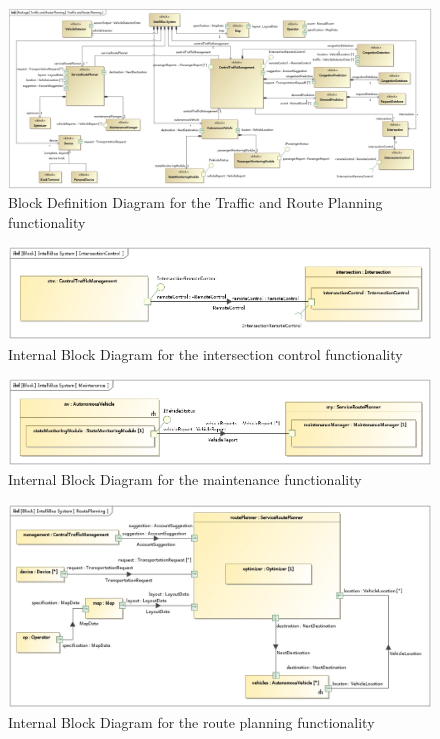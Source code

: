 \documentclass[a4paper]{article}
\begin{document}
\begin{figure}
	\centering
	\includegraphics[width=\textwidth]{bdd-trp.jpg}
	\caption{Block Definition Diagram for the Traffic and Route Planning
		functionality}%
	\label{fig:bdd-trp}
\end{figure}

\begin{figure}
	\centering
	\includegraphics[width=\textwidth]{ibd-intersectioncontrol.jpg}
	\caption{Internal Block Diagram for the intersection control
		functionality}%
	\label{fig:ibd-intersectioncontrol}
\end{figure}

\begin{figure}
	\centering
	\includegraphics[width=\textwidth]{ibd-maintenance.jpg}
	\caption{Internal Block Diagram for the maintenance functionality}%
	\label{fig:ibd-maintenance}
\end{figure}

\begin{figure}
	\centering
	\includegraphics[width=\textwidth]{ibd-routeplanning.jpg}
	\caption{Internal Block Diagram for the route planning functionality}%
	\label{fig:ibd-routeplanning}
\end{figure}
\end{document}
